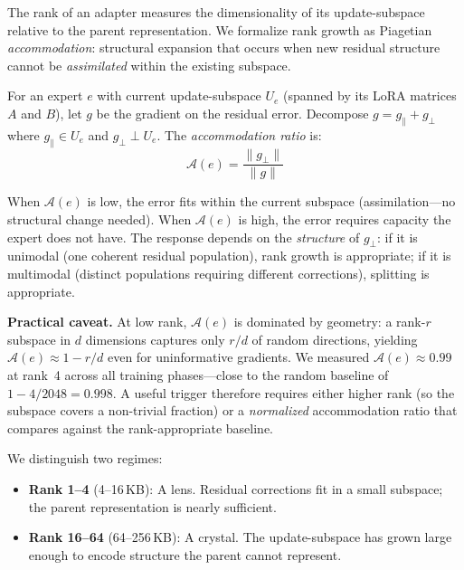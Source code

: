 \documentclass{article}
\begin{document}
The rank of an adapter measures the dimensionality of its update-subspace
relative to the parent representation. We formalize rank growth as Piagetian
\emph{accommodation}: structural expansion that occurs when new residual
structure cannot be \emph{assimilated} within the existing subspace.

For an expert $e$ with current update-subspace $U_e$ (spanned by its LoRA
matrices $A$ and $B$), let $g$ be the gradient on the residual error. Decompose
$g = g_\parallel + g_\perp$ where $g_\parallel \in U_e$ and $g_\perp \perp U_e$.
The \emph{accommodation ratio} is:
\begin{equation}
\mathcal{A}(e) = \frac{\|g_\perp\|}{\|g\|}
\label{eq:accommodation}
\end{equation}

When $\mathcal{A}(e)$ is low, the error fits within the current subspace
(assimilation---no structural change needed). When $\mathcal{A}(e)$ is high,
the error requires capacity the expert does not have. The response depends on
the \emph{structure} of $g_\perp$: if it is unimodal (one coherent residual
population), rank growth is appropriate; if it is multimodal (distinct
populations requiring different corrections), splitting is appropriate.

\textbf{Practical caveat.} At low rank, $\mathcal{A}(e)$ is dominated by
geometry: a rank-$r$ subspace in $d$ dimensions captures only $r/d$ of random
directions, yielding $\mathcal{A}(e) \approx 1 - r/d$ even for uninformative
gradients. We measured $\mathcal{A}(e) \approx 0.99$ at rank~4 across all
training phases---close to the random baseline of $1 - 4/2048 = 0.998$. A
useful trigger therefore requires either higher rank (so the subspace covers a
non-trivial fraction) or a \emph{normalized} accommodation ratio that
compares against the rank-appropriate baseline.

We distinguish two regimes:
\begin{itemize}
    \item \textbf{Rank 1--4} (4--16\,KB): A lens. Residual corrections fit
          in a small subspace; the parent representation is nearly sufficient.
    \item \textbf{Rank 16--64} (64--256\,KB): A crystal. The update-subspace
          has grown large enough to encode structure the parent cannot represent.
\end{itemize}
\end{document}
